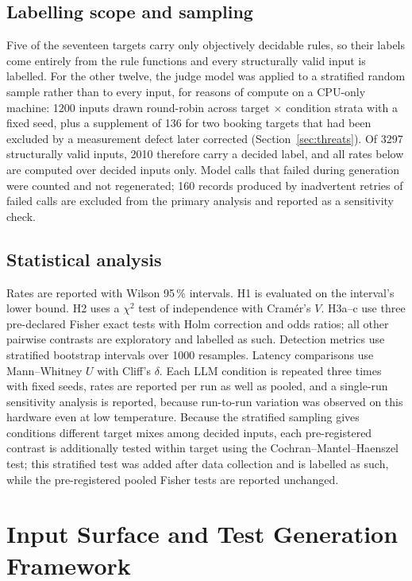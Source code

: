 \documentclass[conference]{IEEEtran}
\begin{document}
\subsection{Labelling scope and sampling}
Five of the seventeen targets carry only objectively decidable rules, so their labels come entirely
from the rule functions and every structurally valid input is labelled. For the other twelve, the
judge model was applied to a stratified random sample rather than to every input, for reasons of
compute on a CPU-only machine: 1200 inputs drawn round-robin across target $\times$ condition strata
with a fixed seed, plus a supplement of 136 for two booking targets that had been excluded by a
measurement defect later corrected (Section~\ref{sec:threats}). Of 3297 structurally valid inputs,
2010 therefore carry a decided label, and all rates below are computed over decided inputs only.
Model calls that failed during generation were counted and not regenerated; 160 records produced by
inadvertent retries of failed calls are excluded from the primary analysis and reported as a
sensitivity check.

\subsection{Statistical analysis}
Rates are reported with Wilson 95\,\% intervals. H1 is evaluated on the interval's lower bound. H2
uses a $\chi^2$ test of independence with Cram\'er's $V$. H3a--c use three pre-declared Fisher exact
tests with Holm correction and odds ratios; all other pairwise contrasts are exploratory and labelled
as such. Detection metrics use stratified bootstrap intervals over 1000 resamples. Latency
comparisons use Mann--Whitney $U$ with Cliff's $\delta$. Each LLM condition is repeated three times
with fixed seeds, rates are reported per run as well as pooled, and a single-run sensitivity analysis
is reported, because run-to-run variation was observed on this hardware even at low temperature.
Because the stratified sampling gives conditions different target mixes among decided inputs, each
pre-registered contrast is additionally tested within target using the Cochran--Mantel--Haenszel
test; this stratified test was added after data collection and is labelled as such, while the
pre-registered pooled Fisher tests are reported unchanged.

\section{Input Surface and Test Generation Framework}
\label{sec:framework}
\end{document}
